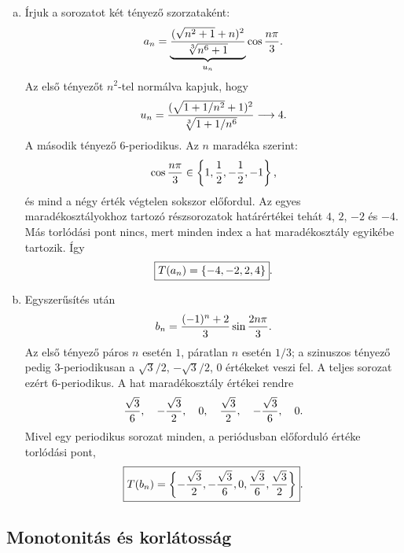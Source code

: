 \documentclass{szb-solution}
\begin{document}
\begin{enumerate}[a)]
  \item Írjuk a sorozatot két tényező szorzataként:
        $$
          a_n=
          \underbrace{\frac{(\sqrt{n^2+1}+n)^2}{\sqrt[3]{n^6+1}}}_{u_n}
          \cos\frac{n\pi}{3}
          \text.
        $$
        Az első tényezőt $n^2$-tel normálva kapjuk, hogy
        $$
          u_n=
          \frac{(\sqrt{1+1/n^2}+1)^2}{\sqrt[3]{1+1/n^6}}
          \longrightarrow4
          \text.
        $$
        A második tényező $6$-periodikus. Az $n$ maradéka szerint:
        $$
          \cos\frac{n\pi}{3}\in
          \left\{1,\frac12,-\frac12,-1\right\}
          \text,
        $$
        és mind a négy érték végtelen sokszor előfordul. Az egyes
        maradékosztályokhoz tartozó részsorozatok határértékei tehát
        $4$, $2$, $-2$ és $-4$. Más torlódási pont nincs, mert minden index
        a hat maradékosztály egyikébe tartozik. Így
        $$
          \boxed{T(a_n)=\{-4,-2,2,4\}}
          \text.
        $$

  \item Egyszerűsítés után
        $$
          b_n=\frac{(-1)^n+2}{3}\sin\frac{2n\pi}{3}
          \text.
        $$
        Az első tényező páros $n$ esetén $1$, páratlan $n$ esetén $1/3$;
        a szinuszos tényező pedig $3$-periodikusan a
        $\sqrt3/2$, $-\sqrt3/2$, $0$ értékeket veszi fel. A teljes sorozat
        ezért $6$-periodikus. A hat maradékosztály értékei rendre
        $$
          \frac{\sqrt3}{6},\quad -\frac{\sqrt3}{2},\quad 0,
          \quad \frac{\sqrt3}{2},\quad -\frac{\sqrt3}{6},\quad 0
          \text.
        $$
        Mivel egy periodikus sorozat minden, a periódusban előforduló értéke
        torlódási pont,
        $$
          \boxed{
            T(b_n)=\left\{-\frac{\sqrt3}{2},-\frac{\sqrt3}{6},0,
            \frac{\sqrt3}{6},\frac{\sqrt3}{2}\right\}
          }
          \text.
        $$
\end{enumerate}

\subsection{Monotonitás és korlátosság}
\end{document}
